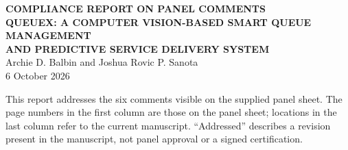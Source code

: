 \documentclass[11pt,letterpaper]{article}
\begin{document}
\begin{center}
  {\Large\bfseries COMPLIANCE REPORT ON PANEL COMMENTS}\\[0.4em]
  {\bfseries QUEUEX: A COMPUTER VISION-BASED SMART QUEUE MANAGEMENT\\
  AND PREDICTIVE SERVICE DELIVERY SYSTEM}\\[0.4em]
  Archie D. Balbin and Joshua Rovic P. Sanota\\
  6 October 2026
\end{center}

This report addresses the six comments visible on the supplied panel
sheet. The page numbers in the first column are those on the panel
sheet; locations in the last column refer to the current manuscript.
``Addressed'' describes a revision present in the manuscript, not panel
approval or a signed certification.
\end{document}
